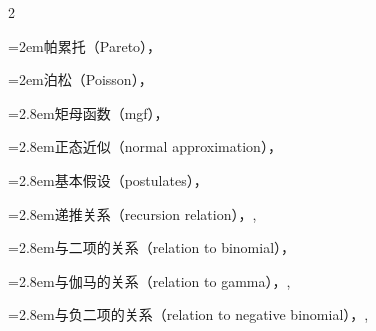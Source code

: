 \begin{multicols}{2}
\par\noindent\hangindent=2em\hspace*{1em}\label{idx:370}帕累托（Pareto），\hyperref[exercise:3.23]{\pageref*{exercise:3.23}}\par
\par\noindent\hangindent=2em\hspace*{1em}\label{idx:371}泊松（Poisson），\hyperref[eq:3.2.5]{\pageref*{eq:3.2.5}}\par
\par\noindent\hangindent=2.8em\hspace*{1.8em}\label{idx:372}矩母函数（mgf），\hyperref[lem:2.3.14]{\pageref*{lem:2.3.14}}\par
\par\noindent\hangindent=2.8em\hspace*{1.8em}\label{idx:373}正态近似（normal approximation），\hyperref[ex:3.4.9]{\pageref*{ex:3.4.9}}\par
\par\noindent\hangindent=2.8em\hspace*{1.8em}\label{idx:374}基本假设（postulates），\hyperref[thm:3.8.1]{\pageref*{thm:3.8.1}}\par
\par\noindent\hangindent=2.8em\hspace*{1.8em}\label{idx:375}递推关系（recursion relation），\hyperref[eq:3.2.6]{\pageref*{eq:3.2.6}}, \hyperref[eq:3.6.2]{\pageref*{eq:3.6.2}}\par
\par\noindent\hangindent=2.8em\hspace*{1.8em}\label{idx:376}与二项的关系（relation to binomial），\hyperref[exercise:4.15]{\pageref*{exercise:4.15}}\par
\par\noindent\hangindent=2.8em\hspace*{1.8em}\label{idx:377}与伽马的关系（relation to gamma），\hyperref[ex:3.3.1]{\pageref*{ex:3.3.1}}, \hyperref[exercise:3.19]{\pageref*{exercise:3.19}}\par
\par\noindent\hangindent=2.8em\hspace*{1.8em}\label{idx:378}与负二项的关系（relation to negative binomial），\hyperref[idxocc:378:110]{\pageref*{idxocc:378:110}}, \hyperref[exercise:3.15]{\pageref*{exercise:3.15}}\par

\end{multicols}
